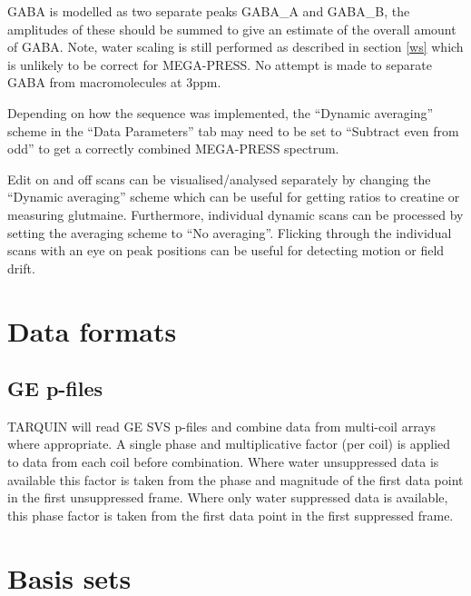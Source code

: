 \documentclass[a4paper,12pt]{article}
\begin{document}
GABA is modelled as two separate peaks GABA\_A and GABA\_B, the amplitudes of these should be summed to give an estimate of the overall amount of GABA.  Note, water scaling is still performed as described in section \ref{ws} which is unlikely to be correct for MEGA-PRESS. No attempt is made to separate GABA from macromolecules at 3ppm.

Depending on how the sequence was implemented, the ``Dynamic averaging'' scheme in the ``Data Parameters'' tab may need to be set to ``Subtract even from odd'' to get a correctly combined MEGA-PRESS spectrum.

Edit on and off scans can be visualised/analysed separately by changing the ``Dynamic averaging'' scheme which can be useful for getting ratios to creatine or measuring glutmaine. Furthermore, individual dynamic scans can be processed by setting the averaging scheme to ``No averaging''. Flicking through the individual scans with an eye on peak positions can be useful for detecting motion or field drift.

\section{Data formats}
\subsection{GE p-files}
TARQUIN will read GE SVS p-files and combine data from multi-coil arrays where appropriate. A single phase and multiplicative factor (per coil) is applied to data from each coil before combination. Where water unsuppressed data is available this factor is taken from the phase and magnitude of the first data point in the first unsuppressed frame. Where only water suppressed data is available, this phase factor is taken from the first data point in the first suppressed frame.


\section{Basis sets}
\end{document}
